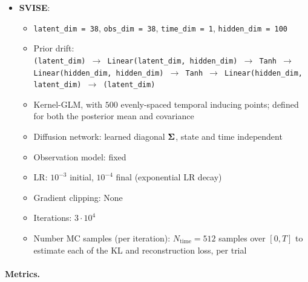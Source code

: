 \begin{itemize}
\begin{itemize}
        \item Kernel-GLM, with $500$ evenly-spaced temporal inducing points; defined for both the posterior mean and covariance
        \item Diffusion network: learned diagonal $\mbSigma$, state and time independent 
        \item Observation model: fixed
        \item LR: $10^{-3}$ initial, $10^{-4}$ final (exponential LR decay)
        \item Gradient clipping: None
        \item Iterations: $3 \cdot 10^4$
        \item Number MC samples (per iteration): $N_{\mathrm{time}} = 512$ samples over $[0, T]$ to estimate each of the KL and reconstruction loss, per trial
    \end{itemize}
    \item \textbf{SVISE}:
    \begin{itemize}
        \item \texttt{latent\_dim = 38}, \texttt{obs\_dim = 38},  \texttt{time\_dim = 1}, \texttt{hidden\_dim = 100}
        \item 
        Prior drift:\\
        \texttt{(latent\_dim) $\to$ Linear(latent\_dim, hidden\_dim) $\to$ Tanh $\to$ Linear(hidden\_dim, hidden\_dim) $\to$ Tanh $\to$ Linear(hidden\_dim, latent\_dim) $\to$ (latent\_dim)}
        \item Kernel-GLM, with $500$ evenly-spaced temporal inducing points; defined for both the posterior mean and covariance
        \item Diffusion network: learned diagonal $\mbSigma$, state and time independent 
        \item Observation model: fixed
        \item LR: $10^{-3}$ initial, $10^{-4}$ final (exponential LR decay)
        \item Gradient clipping: None
        \item Iterations: $3 \cdot 10^4$
        \item Number MC samples (per iteration): $N_{\mathrm{time}} = 512$ samples over $[0, T]$ to estimate each of the KL and reconstruction loss, per trial
    \end{itemize}
\end{itemize}

\paragraph{Metrics.}

